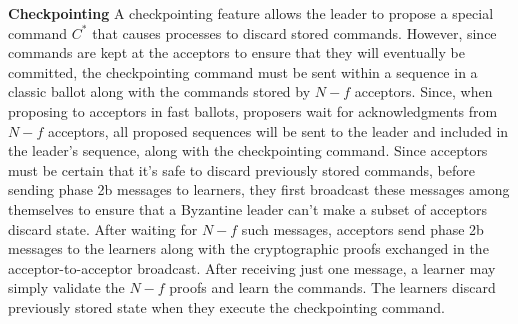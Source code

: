 \noindent \textbf{Checkpointing} A checkpointing feature allows the leader to propose a special command $C^*$ that causes processes to discard stored commands. However, since commands are kept at the acceptors to ensure that they will eventually be committed, the checkpointing command must be sent within a sequence in a classic ballot along with the commands stored by $N-f$ acceptors. Since, when proposing to acceptors in fast ballots, proposers wait for acknowledgments from $N-f$ acceptors, all proposed sequences will be sent to the leader and included in the leader's sequence, along with the checkpointing command. Since acceptors must be certain that it's safe to discard previously stored commands, before sending phase 2b messages to learners, they first broadcast these messages among themselves to ensure that a Byzantine leader can't make a subset of acceptors discard state. After waiting for $N-f$ such messages, acceptors send phase 2b messages to the learners along with the cryptographic proofs exchanged in the acceptor-to-acceptor broadcast. After receiving just one message, a learner may simply validate the $N-f$ proofs and learn the commands. The learners discard previously stored state when they execute the checkpointing command.